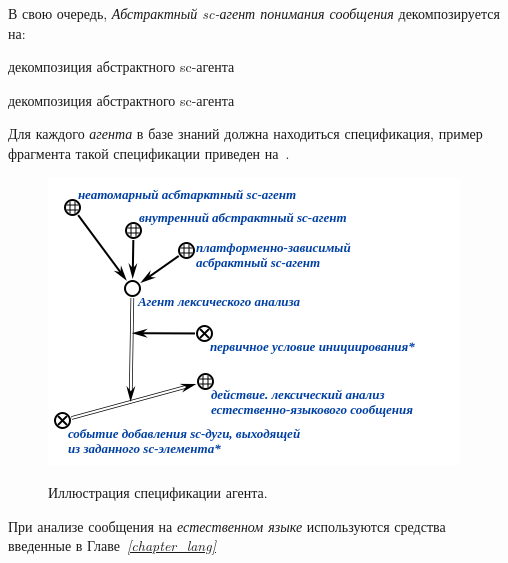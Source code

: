 В свою очередь, \textit{Абстрактный sc-агент понимания сообщения} декомпозируется на:

\begin{SCn}

    \begin{scnrelfromset}{декомпозиция абстрактного sc-агента}
        \begin{scnindent}
            \begin{scnrelfromset}{декомпозиция абстрактного sc-агента}
            \end{scnrelfromset}
        \end{scnindent}
    \end{scnrelfromset}

\end{SCn}

Для каждого \textit{агента} в базе знаний должна находиться спецификация, пример фрагмента такой спецификации приведен на~\textit{}.

\begin{figure}[H]
    \centering
    \caption{Иллюстрация спецификации агента.}
    \includegraphics[scale=0.8]{images/part4/chapter_nl_interfaces/agent_spec}
    \label{fig:agent_spec}
\end{figure}

При анализе сообщения на \textit{естественном языке} используются средства введенные в Главе~\textit{\ref{chapter_lang}~}

